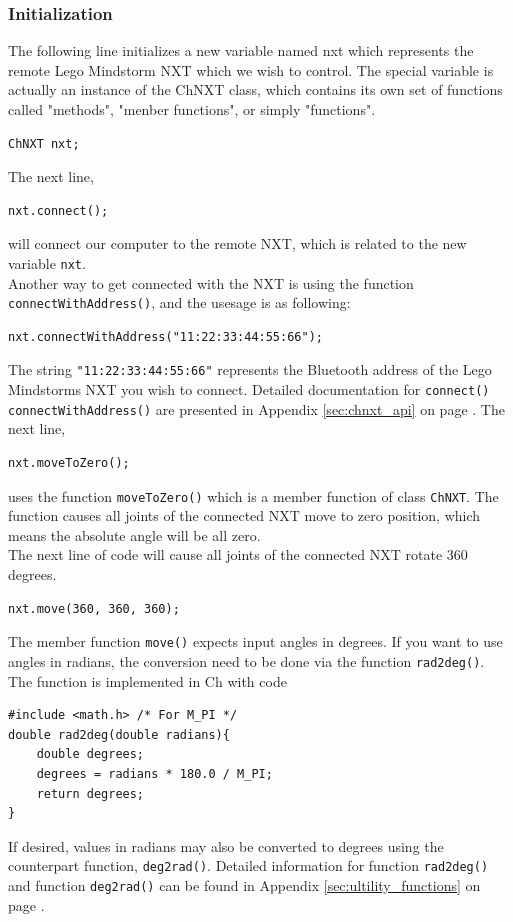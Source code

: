 \documentclass[11pt]{article}
\begin{document}
\subsubsection*{Initialization}
The following line initializes a new variable named nxt which represents the remote Lego Mindstorm NXT which
we wish to control. The special variable is actually an instance of the ChNXT class, which contains its own
set of functions called "methods", "menber functions", or simply "functions".
\begin{verbatim}
ChNXT nxt;
\end{verbatim}

\noindent
The next line,
\begin{verbatim}
nxt.connect();
\end{verbatim}
\noindent
will connect our computer to the remote NXT, which is related to the new variable \texttt{nxt}.\\
\newline
\noindent
Another way to get connected with the NXT is using the function \texttt{connectWithAddress()}, and the usesage
is as following:
\begin{verbatim}
nxt.connectWithAddress("11:22:33:44:55:66");
\end{verbatim}
\noindent
The string \texttt{"11:22:33:44:55:66"} represents the Bluetooth address of the Lego Mindstorms NXT you wish 
to connect. Detailed documentation for \texttt{connect()} \texttt{connectWithAddress()} are presented in 
Appendix \ref{sec:chnxt_api} on page \pageref{sec:chnxt_api}. The next line,
\begin{verbatim}
nxt.moveToZero();
\end{verbatim}
\noindent
uses the function \texttt{moveToZero()} which is a member function of class \texttt{ChNXT}. The function causes
all joints of the connected NXT move to zero position, which means the absolute angle will be all zero.\\
\newline
The next line of code will cause all joints of the connected NXT rotate 360 degrees.
\begin{verbatim}
nxt.move(360, 360, 360);
\end{verbatim}
\noindent
The member function \texttt{move()} expects input angles in degrees. If you want to use angles in radians, the 
conversion need to be done via the function \texttt{rad2deg()}. The function is implemented in Ch with code
\begin{verbatim}
#include <math.h> /* For M_PI */
double rad2deg(double radians){
    double degrees;
    degrees = radians * 180.0 / M_PI;
    return degrees;
}
\end{verbatim}
\noindent
If desired, values in radians may also be converted to degrees using the counterpart function, \texttt{deg2rad()}.
Detailed information for function \texttt{rad2deg()} and function \texttt{deg2rad()} can be found in Appendix 
\ref{sec:ultility_functions} on page \pageref{sec:ultility_functions}.\\
\end{document}
